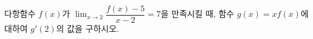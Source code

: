 다항함수 $f(x)$가 $\displaystyle\lim_{x\to 2}\dfrac{f(x)-5}{x-2}=7$을 만족시킬 때, 함수 $g(x)=xf(x)$에 대하여 $g'(2)$의 값을 구하시오.
